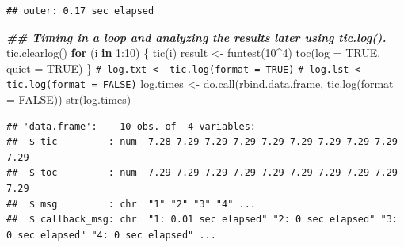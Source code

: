 \documentclass[
]{book}
\newenvironment{Shaded}{\begin{snugshade}}{\end{snugshade}}
\newcommand{\AttributeTok}[1]{\textcolor[rgb]{0.77,0.63,0.00}{#1}}
\newcommand{\CommentTok}[1]{\textcolor[rgb]{0.56,0.35,0.01}{\textit{#1}}}
\newcommand{\ConstantTok}[1]{\textcolor[rgb]{0.00,0.00,0.00}{#1}}
\newcommand{\ControlFlowTok}[1]{\textcolor[rgb]{0.13,0.29,0.53}{\textbf{#1}}}
\newcommand{\DecValTok}[1]{\textcolor[rgb]{0.00,0.00,0.81}{#1}}
\newcommand{\DocumentationTok}[1]{\textcolor[rgb]{0.56,0.35,0.01}{\textbf{\textit{#1}}}}
\newcommand{\FunctionTok}[1]{\textcolor[rgb]{0.00,0.00,0.00}{#1}}
\newcommand{\NormalTok}[1]{#1}
\newcommand{\OtherTok}[1]{\textcolor[rgb]{0.56,0.35,0.01}{#1}}
\newcommand{\SpecialCharTok}[1]{\textcolor[rgb]{0.00,0.00,0.00}{#1}}
\theoremstyle{break}
\theoremstyle{nonumberplain}
\renewcommand{\CommentTok}[1]{\textcolor[rgb]{0.41,0.41,0.41}{\texttt{#1}}}
\begin{document}
\begin{itemize}
\begin{itemize}
\begin{verbatim}
## outer: 0.17 sec elapsed
\end{verbatim}

\begin{Shaded}
\begin{Highlighting}[]
\DocumentationTok{\#\# Timing in a loop and analyzing the results later using tic.log().}
\FunctionTok{tic.clearlog}\NormalTok{()}
\ControlFlowTok{for}\NormalTok{ (i }\ControlFlowTok{in} \DecValTok{1}\SpecialCharTok{:}\DecValTok{10}\NormalTok{)}
\NormalTok{\{}
   \FunctionTok{tic}\NormalTok{(i)}
\NormalTok{   result }\OtherTok{\textless{}{-}} \FunctionTok{funtest}\NormalTok{(}\DecValTok{10}\SpecialCharTok{\^{}}\DecValTok{4}\NormalTok{)}
   \FunctionTok{toc}\NormalTok{(}\AttributeTok{log =} \ConstantTok{TRUE}\NormalTok{, }\AttributeTok{quiet =} \ConstantTok{TRUE}\NormalTok{)}
\NormalTok{\}}
\CommentTok{\# log.txt \textless{}{-} tic.log(format = TRUE)}
\CommentTok{\# log.lst \textless{}{-} tic.log(format = FALSE)}
\NormalTok{log.times }\OtherTok{\textless{}{-}} \FunctionTok{do.call}\NormalTok{(rbind.data.frame, }\FunctionTok{tic.log}\NormalTok{(}\AttributeTok{format =} \ConstantTok{FALSE}\NormalTok{))}
\FunctionTok{str}\NormalTok{(log.times)}
\end{Highlighting}
\end{Shaded}

\begin{verbatim}
## 'data.frame':    10 obs. of  4 variables:
##  $ tic         : num  7.28 7.29 7.29 7.29 7.29 7.29 7.29 7.29 7.29 7.29
##  $ toc         : num  7.29 7.29 7.29 7.29 7.29 7.29 7.29 7.29 7.29 7.29
##  $ msg         : chr  "1" "2" "3" "4" ...
##  $ callback_msg: chr  "1: 0.01 sec elapsed" "2: 0 sec elapsed" "3: 0 sec elapsed" "4: 0 sec elapsed" ...
\end{verbatim}

\begin{Shaded}
\end{Shaded}


\end{itemize}
\end{itemize}
\end{document}
